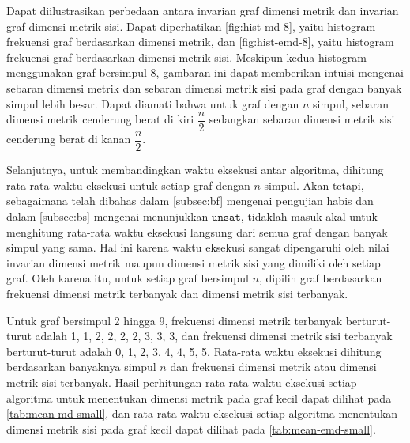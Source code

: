 \documentclass[10pt,twocolumn]{article}
\def\unsat{\mathtt{unsat}}
\newcommand{\minipagewidth}{\linewidth}
\begin{document}
Dapat diilustrasikan perbedaan antara invarian graf dimensi metrik dan invarian graf dimensi metrik sisi. Dapat diperhatikan \autoref{fig:hist-md-8}, yaitu histogram frekuensi graf berdasarkan dimensi metrik, dan \autoref{fig:hist-emd-8}, yaitu histogram frekuensi graf berdasarkan dimensi metrik sisi. Meskipun kedua histogram menggunakan graf bersimpul 8, gambaran ini dapat memberikan intuisi mengenai sebaran dimensi metrik dan sebaran dimensi metrik sisi pada graf dengan banyak simpul lebih besar. Dapat diamati bahwa untuk graf dengan \(n\) simpul, sebaran dimensi metrik cenderung berat di kiri \(\dfrac{n}{2}\) sedangkan sebaran dimensi metrik sisi cenderung berat di kanan \(\dfrac{n}{2}\).

\begin{center}
	\renewcommand{\minipagewidth}{0.9\linewidth}

	

	\vspace{1em}

	
\end{center}

Selanjutnya, untuk membandingkan waktu eksekusi antar algoritma, dihitung rata-rata waktu eksekusi untuk setiap graf dengan \(n\) simpul. Akan tetapi, sebagaimana telah dibahas dalam \autoref{subsec:bf} mengenai pengujian habis dan dalam \autoref{subsec:bs} mengenai menunjukkan \(\unsat\), tidaklah masuk akal untuk menghitung rata-rata waktu eksekusi langsung dari semua graf dengan banyak simpul yang sama. Hal ini karena waktu eksekusi sangat dipengaruhi oleh nilai invarian dimensi metrik maupun dimensi metrik sisi yang dimiliki oleh setiap graf. Oleh karena itu, untuk setiap graf bersimpul \(n\), dipilih graf berdasarkan frekuensi dimensi metrik terbanyak dan dimensi metrik sisi terbanyak.

Untuk graf bersimpul 2 hingga 9, frekuensi dimensi metrik terbanyak berturut-turut adalah 1, 1, 2, 2, 2, 2, 3, 3, 3, dan frekuensi dimensi metrik sisi terbanyak berturut-turut adalah 0, 1, 2, 3, 4, 4, 5, 5.  Rata-rata waktu eksekusi dihitung berdasarkan banyaknya simpul \(n\) dan frekuensi dimensi metrik atau dimensi metrik sisi terbanyak. Hasil perhitungan rata-rata waktu eksekusi setiap algoritma untuk menentukan dimensi metrik pada graf kecil dapat dilihat pada \autoref{tab:mean-md-small}, dan rata-rata waktu eksekusi setiap algoritma menentukan dimensi metrik sisi pada graf kecil dapat dilihat pada \autoref{tab:mean-emd-small}.

\begin{center}
	\renewcommand{\minipagewidth}{\linewidth}

	

	\vspace{1em}

	
\end{center}
\end{document}
